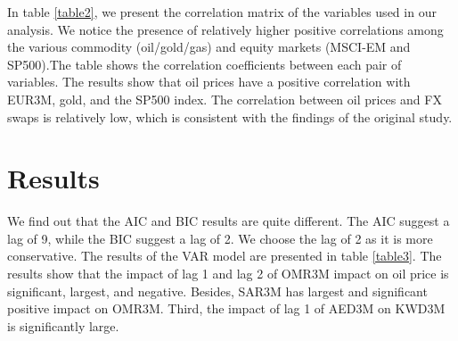 \documentclass[12pt]{article}
\begin{document}
\begin{sloppypar}
In table \ref{table2}, we present the correlation matrix of the variables used in our analysis. We notice the presence of relatively higher positive correlations among the various commodity (oil/gold/gas) and equity markets (MSCI-EM and SP500).The table shows the correlation coefficients between each pair of variables. The results show that oil prices have a positive correlation with EUR3M, gold, and the SP500 index. The correlation between oil prices and FX swaps is relatively low, which is consistent with the findings of the original study. 

\section{Results}
We find out that the AIC and BIC results are quite different. The AIC suggest a lag of 9, while the BIC suggest a lag of 2. We choose the lag of 2 as it is more conservative. The results of the VAR model are presented in table \ref{table3}. The results show that the impact of lag 1 and lag 2 of OMR3M impact on oil price is significant, largest, and negative. Besides, SAR3M has largest and significant positive impact on OMR3M. Third, the impact of lag 1 of AED3M on KWD3M is significantly large. 
\begin{table}[ht]
    \centering
    \caption{VAR Model Results(5\%)}
    \label{table3}
\end{table}
\end{sloppypar}
\end{document}
